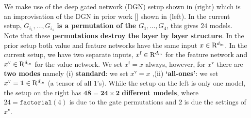 We make use of the deep gated network (DGN) setup shown in  (right) which is an improvisation of the DGN in prior work [] shown in  (left). In the current setup, {\bf{$G_{i_1},\ldots,G_{i_4}$ is a permutation of the $G_1,\ldots,G_4$}}, this gives $24$ models. Note that these \textbf{permutations destroy the layer by layer structure}. In the prior setup both value and feature networks have the same input $x\in\mathrm{R}^{d_{\text{in}}}$. In the current setup, we have two separate inputs, $x^{\text{f}}\in\mathrm{R}^{d_{\text{in}}}$ for the feature network and $x^{\text{v}}\in\mathrm{R}^{d_{\text{in}}}$ for the value network. We set $x^{\text{f}}=x$ always, however, for $x^{\text{v}}$ there are \textbf{two modes} namely (i) \textbf{standard}: we set $x^{\text{v}}=x$ ,(ii) \textbf{`all-ones'}: we set $x^{\text{v}}=\mathbf{1}\in\mathrm{R}^{d_{\text{in}}}$ (a tensor of all $1$'s). While the setup on the left is only one model, the setup on the right has $\mathbf{48=24\times 2}$ \textbf{different models}, where $24=\texttt{factorial}(4)$ is due to the gate permutations and $2$ is due the settings of $x^{\text{v}}$.

